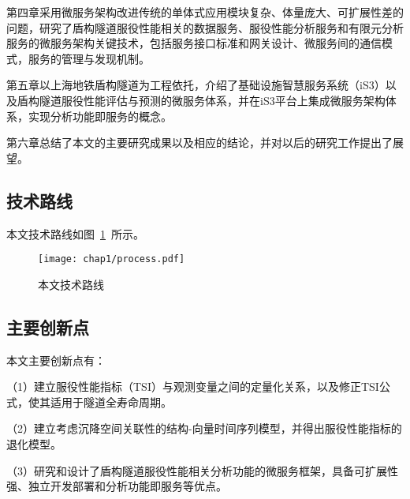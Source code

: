 第四章采用微服务架构改进传统的单体式应用模块复杂、体量庞大、可扩展性差的问题，研究了盾构隧道服役性能相关的数据服务、服役性能分析服务和有限元分析服务的微服务架构关键技术，包括服务接口标准和网关设计、微服务间的通信模式，服务的管理与发现机制。

第五章以上海地铁盾构隧道为工程依托，介绍了基础设施智慧服务系统（iS3）以及盾构隧道服役性能评估与预测的微服务体系，并在iS3平台上集成微服务架构体系，实现分析功能即服务的概念。

第六章总结了本文的主要研究成果以及相应的结论，并对以后的研究工作提出了展望。 

\subsection{技术路线}

本文技术路线如图~\ref{fig:本文技术路线}~所示。

\begin{figure}[htb!]
    \centering
    \texttt{[image: chap1/process.pdf]}
    \caption{本文技术路线}
    \label{fig:本文技术路线}
\end{figure}

\subsection{主要创新点}

本文主要创新点有：

（1）建立服役性能指标（TSI）与观测变量之间的定量化关系，以及修正TSI公式，使其适用于隧道全寿命周期。

（2）建立考虑沉降空间关联性的结构-向量时间序列模型，并得出服役性能指标的退化模型。

（3）研究和设计了盾构隧道服役性能相关分析功能的微服务框架，具备可扩展性强、独立开发部署和分析功能即服务等优点。
